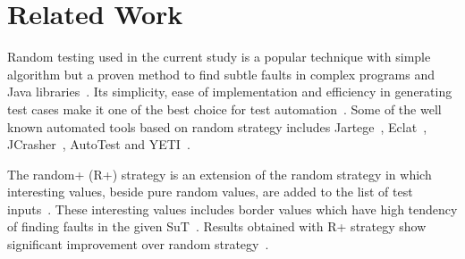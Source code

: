 \documentclass[conference]{IEEEtran}
\begin{document}










\section{Related Work}\label{sec:rw}

Random testing used in the current study is a popular technique with simple algorithm but a proven method to find subtle faults in complex programs and Java libraries~\cite{Pacheco2005, Csallner2004}. Its simplicity, ease of implementation and efficiency in generating test cases make it one of the best choice for test automation~\cite{Hamlet1994}. Some of the well known automated tools based on random strategy includes Jartege~\cite{Oriat2004}, Eclat~\cite{Pacheco2005}, JCrasher~\cite{Csallner2004}, AutoTest \cite{Ciupa2008} and YETI~\cite{Oriol2012}.

The random+ (R+) strategy is an extension of the random strategy in which interesting values, beside pure random values, are added to the list of test inputs~\cite{Leitner2007}. These interesting values includes border values which have high tendency of finding faults in the given SuT~\cite{Beizer1990}. Results obtained with R+ strategy show significant improvement over random strategy~\cite{Leitner2007}. 
\end{document}
